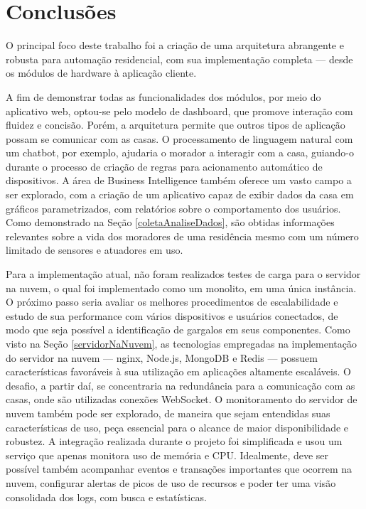 \chapter{Conclusões}

O principal foco deste trabalho foi a criação de uma arquitetura abrangente e robusta para automação residencial, com sua implementação completa --- desde os módulos de hardware à aplicação cliente.

A fim de demonstrar todas as funcionalidades dos módulos, por meio do aplicativo web, optou-se pelo modelo de dashboard, que promove interação com fluidez e concisão. Porém, a arquitetura permite que outros tipos de aplicação possam se comunicar com as casas. O processamento de linguagem natural com um chatbot, por exemplo, ajudaria o morador a interagir com a casa, guiando-o durante o processo de criação de regras para acionamento automático de dispositivos. A área de Business Intelligence também oferece um vasto campo a ser explorado, com a criação de um aplicativo capaz de exibir dados da casa em gráficos parametrizados, com relatórios sobre o comportamento dos usuários. Como demonstrado na Seção \ref{coletaAnaliseDados}, são obtidas informações relevantes sobre a vida dos moradores de uma residência mesmo com um número limitado de sensores e atuadores em uso.

Para a implementação atual, não foram realizados testes de carga para o servidor na nuvem, o qual foi  implementado como um monolito, em uma única instância. O próximo passo seria avaliar os melhores procedimentos de escalabilidade e estudo de sua performance com vários dispositivos e usuários conectados, de modo que seja possível a identificação de gargalos em seus componentes. Como visto na Seção \ref{servidorNaNuvem}, as tecnologias empregadas na implementação do servidor na nuvem --- nginx, Node.js, MongoDB e Redis --- possuem características favoráveis à sua utilização em aplicações altamente escaláveis.  O desafio, a partir daí, se concentraria na redundância para a comunicação com as casas, onde são utilizadas conexões WebSocket.
O monitoramento do servidor de nuvem também pode ser explorado, de maneira que sejam entendidas suas características de uso, peça essencial para o alcance de maior disponibilidade e robustez. A integração realizada durante o projeto foi simplificada e usou um serviço que apenas monitora uso de memória e CPU. Idealmente, deve ser possível também acompanhar eventos e transações importantes que ocorrem na nuvem, configurar alertas de picos de uso de recursos e poder ter uma visão consolidada dos logs, com busca e estatísticas.

